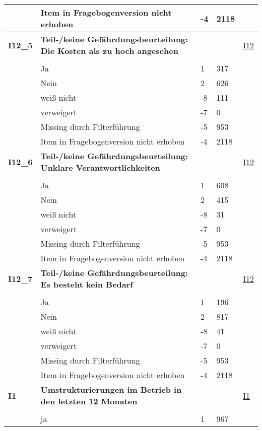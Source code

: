 \begin{longtable}{| L{2.5cm} | L{8.25cm}| C{1.5cm} | R{1.25cm} | C{2.25cm} |  }
   & Item in Fragebogenversion nicht erhoben & -4 & 2118 &  \\ 
   \midrule
\textbf{I12\_5}\label{var:suf:I12:5} & \textbf{Teil-/keine Gefährdungsbeurteilung: Die Kosten als zu hoch angesehen} &  &  & \hyperref[I12]{I12} \\ 
   &  &  &  &  \\ 
   & Ja & 1 & 317 &  \\ 
   & Nein & 2 & 626 &  \\ 
   & weiß nicht & -8 & 111 &  \\ 
   & verweigert & -7 & 0 &  \\ 
   & Missing durch Filterführung & -5 & 953 &  \\ 
   & Item in Fragebogenversion nicht erhoben & -4 & 2118 &  \\ 
   \midrule
\textbf{I12\_6}\label{var:suf:I12:6} & \textbf{Teil-/keine Gefährdungsbeurteilung: Unklare Verantwortlichkeiten} &  &  & \hyperref[I12]{I12} \\ 
   &  &  &  &  \\ 
   & Ja & 1 & 608 &  \\ 
   & Nein & 2 & 415 &  \\ 
   & weiß nicht & -8 & 31 &  \\ 
   & verweigert & -7 & 0 &  \\ 
   & Missing durch Filterführung & -5 & 953 &  \\ 
   & Item in Fragebogenversion nicht erhoben & -4 & 2118 &  \\ 
   \midrule
\textbf{I12\_7}\label{var:suf:I12:7} & \textbf{Teil-/keine Gefährdungsbeurteilung: Es besteht kein Bedarf} &  &  & \hyperref[I12]{I12} \\ 
   &  &  &  &  \\ 
   & Ja & 1 & 196 &  \\ 
   & Nein & 2 & 817 &  \\ 
   & weiß nicht & -8 & 41 &  \\ 
   & verweigert & -7 & 0 &  \\ 
   & Missing durch Filterführung & -5 & 953 &  \\ 
   & Item in Fragebogenversion nicht erhoben & -4 & 2118 &  \\ 
   \midrule
\textbf{I1}\label{var:suf:I1} & \textbf{Umstrukturierungen im Betrieb in den letzten 12 Monaten} &  &  & \hyperref[I1]{I1} \\ 
   &  &  &  &  \\ 
   & ja & 1 & 967 &  \\ 

\end{longtable}
